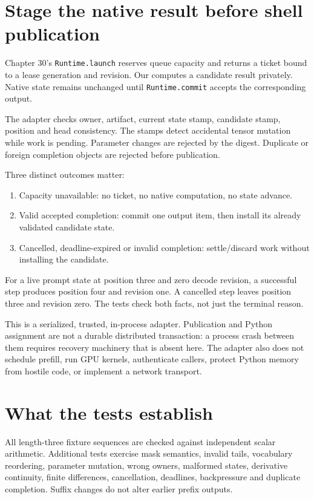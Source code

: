 \section{Stage the native result before shell publication}
Chapter 30's \texttt{Runtime.launch} reserves queue capacity and returns a ticket
bound to a lease generation and revision. Our  computes a
candidate result privately. Native state remains unchanged until
\texttt{Runtime.commit} accepts the corresponding output.

The adapter checks owner, artifact, current state stamp, candidate stamp,
position and head consistency. The stamps detect accidental tensor mutation
while work is pending. Parameter changes are rejected by the digest.
Duplicate or foreign completion objects are rejected before publication.

Three distinct outcomes matter:
\begin{enumerate}
\item Capacity unavailable: no ticket, no native computation, no state advance.
\item Valid accepted completion: commit one output item, then install its
already validated candidate state.
\item Cancelled, deadline-expired or invalid completion: settle/discard work
without installing the candidate.
\end{enumerate}
For a live prompt state at position three and zero decode revision, a successful
step produces position four and revision one. A cancelled step leaves position
three and revision zero. The tests check both facts, not just the terminal reason.

This is a serialized, trusted, in-process adapter. Publication and Python
assignment are not a durable distributed transaction: a process crash between
them requires recovery machinery that is absent here. The adapter also does not
schedule prefill, run GPU kernels, authenticate callers, protect Python memory
from hostile code, or implement a network transport.

\section{What the tests establish}
All length-three fixture sequences are checked against independent scalar
arithmetic. Additional tests exercise mask semantics, invalid tails, vocabulary
reordering, parameter mutation, wrong owners, malformed states, derivative
continuity, finite differences, cancellation, deadlines, backpressure and
duplicate completion. Suffix changes do not alter earlier prefix outputs.

